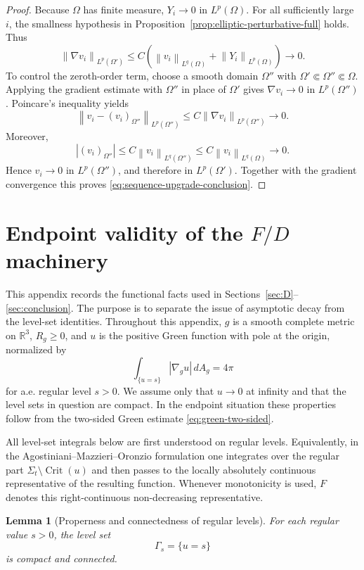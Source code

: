 \documentclass[11pt]{amsart}
\numberwithin{equation}{section}
\newtheorem{lemma}[theorem]{Lemma}
\theoremstyle{definition}
\newcommand{\R}{\mathbb R}
\newcommand{\norm}[1]{\left\lVert #1\right\rVert}
\newcommand{\Crit}{\operatorname{Crit}}
\begin{document}
\begin{proof}
Because $\Omega$ has finite measure, $Y_i\to0$ in $L^p(\Omega)$.  For all sufficiently large $i$, the smallness hypothesis in Proposition~\ref{prop:elliptic-perturbative-full} holds.  Thus
$$
        \norm{\nabla v_i}_{L^p(\Omega')}
        \le C\left(\norm{v_i}_{L^q(\Omega)}+
        \norm{Y_i}_{L^p(\Omega)}\right)\to0.
$$
To control the zeroth-order term, choose a smooth domain $\Omega''$ with $\Omega'\Subset\Omega''\Subset\Omega$.  Applying the gradient estimate with $\Omega''$ in place of $\Omega'$ gives $\nabla v_i\to0$ in $L^p(\Omega'')$.  Poincare's inequality yields
$$
        \norm{v_i-(v_i)_{\Omega''}}_{L^p(\Omega'')}
        \le C\norm{\nabla v_i}_{L^p(\Omega'')}\to0.
$$
Moreover,
$$
        |(v_i)_{\Omega''}|
        \le C\norm{v_i}_{L^q(\Omega'')}
        \le C\norm{v_i}_{L^q(\Omega)}\to0.
$$
Hence $v_i\to0$ in $L^p(\Omega'')$, and therefore in $L^p(\Omega')$.  Together with the gradient convergence this proves \eqref{eq:sequence-upgrade-conclusion}.
\end{proof}

\section{\texorpdfstring{Endpoint validity of the $F/D$ machinery}{Endpoint validity of the F/D machinery}}
\label{app:FD-endpoint}

This appendix records the functional facts used in Sections~\ref{sec:D}--\ref{sec:conclusion}.  The purpose is to separate the issue of asymptotic decay from the level-set identities.  Throughout this appendix, $g$ is a smooth complete metric on $\R^3$, $R_g\ge0$, and $u$ is the positive Green function with pole at the origin, normalized by
$$
        \int_{\{u=s\}} |\nabla_g u|\,dA_g=4\pi
$$
for a.e. regular level $s>0$.  We assume only that $u\to0$ at infinity and that the level sets in question are compact.  In the endpoint situation these properties follow from the two-sided Green estimate \eqref{eq:green-two-sided}.

All level-set integrals below are first understood on regular levels.  Equivalently, in the Agostiniani--Mazzieri--Oronzio formulation one integrates over the regular part $\Sigma_t\setminus\Crit(u)$ and then passes to the locally absolutely continuous representative of the resulting function.  Whenever monotonicity is used, $F$ denotes this right-continuous non-decreasing representative.

\begin{lemma}[Properness and connectedness of regular levels]\label{lem:level-connected}
For each regular value $s>0$, the level set
$$
        \Gamma_s=\{u=s\}
$$
is compact and connected.
\end{lemma}
\end{document}

